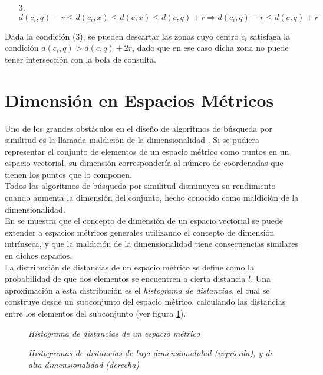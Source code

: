 \begin{enumerate}
\item [3.] $d(c_i,q) - r \leq d(c_i,x) \leq d(c,x) \leq d(c,q) + r \Rightarrow d(c_i,q) - r \leq d(c,q) + r$
\end{enumerate}

Dada la condici\'on (3), se pueden descartar las zonas cuyo centro $c_i$ satisfaga la condici\'on $d(c_i,q)  > d(c,q) +2r$, dado que en ese caso dicha zona no puede tener intersecci\'on con la bola de consulta.

\section{Dimensi\'on en Espacios M\'etricos}

Uno de los grandes obst\'aculos en el dise\~no de algoritmos de b\'usqueda por similitud es la llamada maldici\'on de la dimensionalidad \cite{oursurvey}. Si se pudiera representar el conjunto de elementos de un espacio m\'etrico como puntos en un espacio vectorial, su dimensi\'on corresponder\'ia al n\'umero de coordenadas que tienen los puntos que lo componen. \\

Todos los algoritmos de b\'usqueda por similitud disminuyen su rendimiento cuando aumenta la  dimensi\'on del conjunto, hecho conocido como maldici\'on de la dimensionalidad. \\

En \cite{oursurvey} se muestra que el concepto de dimensi\'on de un espacio vectorial se puede extender a espacios m\'etricos generales utilizando el concepto de dimensi\'on intr\'inseca, y que la maldici\'on de la dimensionalidad tiene consecuencias similares en dichos espacios.\\

La distribuci\'on de distancias de un espacio m\'etrico se define como la probabilidad de que dos elementos se encuentren a cierta distancia $l$. Una aproximaci\'on a esta distribuci\'on es el \textit{histograma de distancias}, el cual se construye desde un subconjunto del espacio m\'etrico, calculando las distancias entre los elementos del subconjunto (ver figura \ref{defineH}).\\
 
 \begin{figure}[tb!]
\centerline{%
  }
  \caption [Histograma de distancias de un espacio m\'etrico]
  {\footnotesize {\textsl {Histograma de distancias de un espacio m\'etrico}}}
\label{defineH}
\end{figure}
\begin{figure}[tb]
  \centerline{%
    }
    \caption [Histogramas de distancias de baja y
               alta dimensionalidad]
      { \textsl{\footnotesize Histogramas de distancias de baja dimensionalidad
                  (izquierda), y  de alta dimensionalidad (derecha)}}
  \label{dim1}
  \end{figure}

